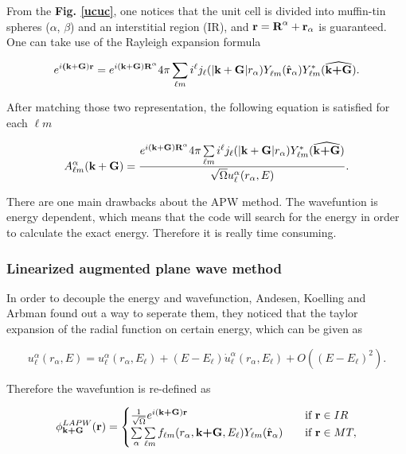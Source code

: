 \documentclass[a4paper, 12pt, titlepage,oneside,drop]{kthesis}
\begin{document}
From the \textbf{Fig. \ref{ucuc}}, one notices that the unit cell is divided into muffin-tin spheres ($\alpha$, $\beta$) and an
interstitial region (IR), and ${\textbf r = {\textbf R^{\alpha}}+{\textbf r_{\alpha}}}$ is guaranteed. One can take use of the Rayleigh expansion formula

\begin{equation}
\expg<(\textbf {k}+\textbf{G})> = e^{i (\textbf {k}+\textbf{G}) \textbf{R}^{\alpha} } 4 \pi \sumlm<\ell><m> i^{\ell} \bessf< |\textbf{k}+\textbf{G}|> \sphfr<\ell{m}><r><> \sphfq<\ell{m}><\textbf{k}+\textbf{G}><*> .
\end{equation}
  
After matching those two representation, the following equation is satisfied for each ${\ell}m$

\begin{equation}
A _{{\ell}m}^{\alpha} (\textbf {k}+\textbf{G}) = \frac{ e^{i (\textbf {k}+\textbf{G}) \textbf{R}^{\alpha} } 4 \pi \sumlm<\ell><m> i^{\ell} \bessf< |\textbf{k}+\textbf{G}|> \sphfq<\ell{m}><\textbf{k}+\textbf{G}><*> }{\sqrt{\Omega} u_{{\ell}}^{\alpha}(r_{\alpha}, E)}.
\end{equation}

There are one main drawbacks about the APW method. The wavefuntion is energy dependent, which means that
 the code will search for the energy in order to calculate the exact energy. Therefore it 
is really time consuming. 

\subsubsection{Linearized augmented plane wave method}
\noindent In order to decouple the energy and wavefunction, Andesen, Koelling and Arbman found out a way to seperate them, they noticed that the taylor expansion of the radial function
on certain energy, which can be given as

\begin{equation}\label{ap3}
 u_{{\ell}}^{\alpha}(r_{\alpha}, E) = u_{{\ell}}^{\alpha}(r_{\alpha}, E_{\ell}) + (E-E_{\ell}) \dot{u}_{{\ell}}^{\alpha}(r_{\alpha}, E_{\ell}) + O((E-E_{\ell})^2).
\end{equation}

Therefore the wavefuntion is re-defined as 

\begin{equation}\label{lap4}
\phi^{LAPW}_\textbf{k+G} (\textbf{r})= 
\begin{cases} \frac {1}{\sqrt{\Omega}} e^{i(\textbf{k+G})\textbf{r}} & \quad \mbox{if $\textbf{r} \in IR $}
\\
\sumg<\alpha>\sum\limits_{{\ell}m} f_{{\ell}{m}} (r_{\alpha},\textbf{k+G}, E_{\ell}) Y_{{\ell}m}(\hat{\textbf{r}}_{\alpha})  & \quad \mbox{if $\textbf{r} \in MT, $}\\ 
\end{cases}
\end{equation}
\end{document}
